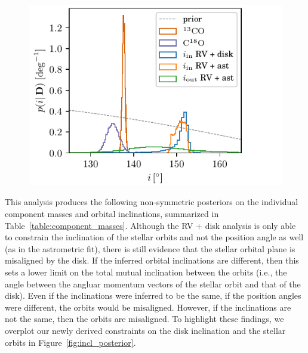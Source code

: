 \documentclass[twocolumn]{aastex61}
\begin{document}
\begin{figure}[ht!]
\begin{center}
  \includegraphics{incl_posterior.pdf}
  \end{center}
\end{figure}

This analysis produces the following non-symmetric posteriors on the individual component masses and orbital inclinations, summarized in Table~\ref{table:component_masses}. Although the RV + disk analysis is only able to constrain the inclination of the stellar orbits and not the position angle as well (as in the astrometric fit), there is still evidence that the stellar orbital plane is misaligned by the disk. If the inferred orbital inclinations are different, then this sets a lower limit on the total mutual inclination between the orbits (i.e., the angle between the angluar momentum vectors of the stellar orbit and that of the disk). Even if the inclinations were inferred to be the same, if the position angles were different, the orbits would be misaligned. However, if the inclinations are not the same, then the orbits are misaligned. To highlight these findings, we overplot our newly derived constraints on the disk inclination and the stellar orbits in Figure~\ref{fig:incl_posterior}.
\end{document}
